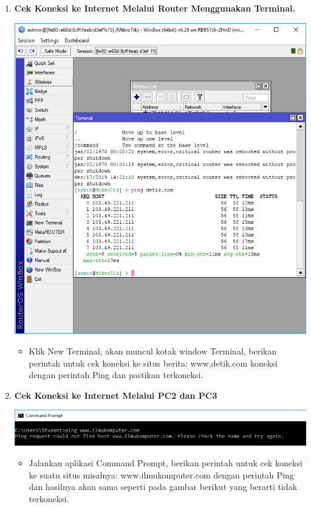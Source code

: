 \documentclass[a4paper,12pt]{article}
\begin{document}
\begin{enumerate}[label=\textbf{\arabic*.}]
    \item \textbf{Cek Koneksi ke Internet Melalui Router Menggunakan Terminal.}
        \begin{center}
            \includegraphics[width=0.8\linewidth]{image10.png}
        \end{center}
        \begin{itemize}
            \item Klik New Terminal, akan muncul kotak window Terminal, berikan perintah untuk cek koneksi ke situs berita: www,detik.com koneksi dengan perintah Ping dan pastikan terkoneksi.
        \end{itemize}

    \item \textbf{Cek Koneksi ke Internet Melalui PC2 dan PC3}
        \begin{center}
            \includegraphics[width=0.8\linewidth]{image11.png}
        \end{center}
        \begin{itemize}
            \item Jalankan aplikasi Command Prompt, berikan perintah untuk cek koneksi ke suatu situs misalnya: www.ilmukomputer.com dengan perintah Ping dan hasilnya akan sama seperti pada gambar berikut yang berarti tidak terkoneksi.
        \end{itemize}


\end{enumerate}
\end{document}
